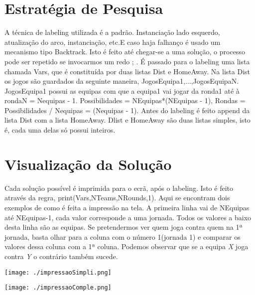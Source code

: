 \documentclass[runningheads,a4paper]{llncs}
\begin{document}
\section{Estratégia de Pesquisa}
A técnica de labeling utilizada é a padrão. Instanciação lado esquerdo, atualização do arco, instanciação, etc.E caso haja falhanço é usado um mecanismo tipo Backtrack. Isto é feito até chegar-se a uma solução, o processo pode ser repetido se invocarmos um redo ; . É passado para o labeling uma lista chamada Vars, que é constituída por duas listas Dist e HomeAway. Na lista Dist os jogos são guardados da seguinte maneira, \lbrack JogosEquipa1,...,JogosEquipaN\rbrack. JogosEquipa1 possui as equipas com que a equipa1 vai jogar da ronda1 até à rondaN = Nequipas - 1. Possibilidades = NEquipas*(NEquipas - 1), Rondas = Possibilidades / Nequipas = (Nequipas - 1). Antes do labeling é feito append da lista Dist com a lista HomeAway. Dlist e HomeAway são duas listas simples, isto é, cada uma delas só possui inteiros.

\section{Visualização da Solução}
Cada solução possível é imprimida para o ecrã, após o labeling. Isto é feito através da regra, print(Vars,NTeams,NRounds,1). Aqui se encontram dois exemplos de como é feita a impressão na tela. A primeira linha vai de NEquipas até NEquipas-1, cada valor corresponde a uma jornada. Todos os valores a baixo desta linha são as equipas. Se pretendermos ver quem joga contra quem na 1ª jornada, basta olhar para a coluna com o número 1(jornada 1) e comparar os valores dessa coluna com a 1ª coluna. Podemos observar que se a equipa \textit{X} joga contra \textit{Y} o contrário também sucede.

\begin{center}
\texttt{[image: ./impressaoSimpli.png]}
\end{center}

\begin{center}
\texttt{[image: ./impressaoComple.png]}
\end{center}
\end{document}
